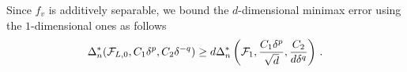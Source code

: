 Since $f_v$ is additively separable, we bound the $d$-dimensional minimax error using the $1$-dimensional ones as follows
% 
% 
% 
\begin{align*}
\Delta_n^*(\mathcal{F}_{L,0}, C_1 \delta^p ,C_2 \delta^{-q}) \ge d \Delta_n^{*}\left(\mathcal{F}_1,\frac{C_1\delta^p}{\sqrt d}, \frac{C_2}{d\delta^q}\right)\,. 
\end{align*}
